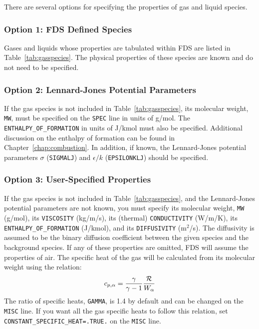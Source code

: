 \documentclass[11pt]{book}
\newcommand{\ct}{\tt\small}
\newcommand{\be}{\begin{equation}}
\newcommand{\ee}{\end{equation}}
\begin{document}
There are several options for specifying the properties of gas and liquid species.

\subsubsection{Option 1: FDS Defined Species}

Gases and liquids whose properties are tabulated within FDS are listed in Table~\ref{tab:gasspecies}. The physical properties of these species are known and do not need to be specified.

\subsubsection{Option 2: Lennard-Jones Potential Parameters}

If the gas species is not included in Table~\ref{tab:gasspecies}, its molecular weight, {\ct MW}, must be specified on the {\ct SPEC} line in units of g/mol. The {\ct ENTHALPY\_OF\_FORMATION} in units of J/kmol must also be specified. Additional discussion on the enthalpy of formation can be found in Chapter~\ref{chap:combustion}. In addition, if known, the Lennard-Jones potential parameters $\sigma$ ({\ct SIGMALJ}) and $\epsilon/k$ ({\ct EPSILONKLJ}) should be specified.

\subsubsection{Option 3: User-Specified Properties}

If the gas species is not included in Table~\ref{tab:gasspecies}, and the Lennard-Jones potential parameters are not known, you must specify its molecular weight, {\ct MW} (g/mol), its {\ct VISCOSITY} (kg/m/s), its (thermal) {\ct CONDUCTIVITY} (W/m/K), its {\ct ENTHALPY\_OF\_FORMATION} (J/kmol), and its {\ct DIFFUSIVITY} (m$^2$/s). The diffusivity is assumed to be the binary diffusion coefficient between the given species and the background species. If any of these properties are omitted, FDS will assume the properties of air. The specific heat of the gas will be calculated from its molecular weight using the relation:
\be
   c_{p,\alpha} = \frac{\gamma}{\gamma-1} \frac{\cal R}{W_\alpha}
\ee
The ratio of specific heats, {\ct GAMMA}, is 1.4 by default and can be changed on the {\ct MISC} line. If you want all the gas specific heats to
follow this relation, set {\ct CONSTANT\_SPECIFIC\_HEAT=.TRUE.} on the {\ct MISC} line.
\end{document}
